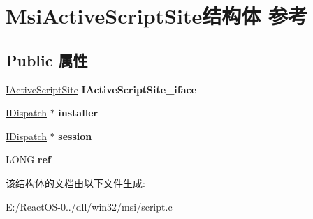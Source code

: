 \hypertarget{struct_msi_active_script_site}{}\section{Msi\+Active\+Script\+Site结构体 参考}
\label{struct_msi_active_script_site}
\subsection*{Public 属性}
\begin{DoxyCompactItemize}
\item 
\mbox{\label{struct_msi_active_script_site_abf5325a608a1bf7aa70fcdf26d2268d3}} 
\hyperlink{interface_i_active_script_site}{I\+Active\+Script\+Site} {\bfseries I\+Active\+Script\+Site\+\_\+iface}
\item 
\mbox{\label{struct_msi_active_script_site_a3b8c06eee8552ddbcc22ceca331c998d}} 
\hyperlink{interface_i_dispatch}{I\+Dispatch} $\ast$ {\bfseries installer}
\item 
\mbox{\label{struct_msi_active_script_site_a96309558e686c8960f9d5c77ba45114d}} 
\hyperlink{interface_i_dispatch}{I\+Dispatch} $\ast$ {\bfseries session}
\item 
\mbox{\label{struct_msi_active_script_site_a2aa5942ce2deaf2b602c152f3d28502f}} 
L\+O\+NG {\bfseries ref}
\end{DoxyCompactItemize}


该结构体的文档由以下文件生成\+:\begin{DoxyCompactItemize}
\item 
E\+:/\+React\+O\+S-\/0../dll/win32/msi/script.\+c\end{DoxyCompactItemize}
